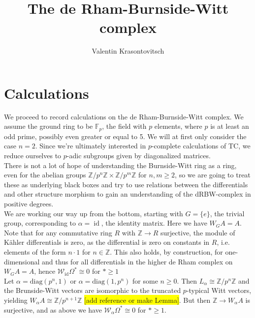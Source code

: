 \documentclass[10pt, a4paper, UKenglish]{article}
\title{The de Rham-Burnside-Witt complex}
\author{Valentin Krasontovitsch}
\numberwithin{equation}{section}
\newcommand{\bF}{\mathbb{F}}
\newcommand{\cW}{\mathcal{W}}
\newcommand{\bZ}{\mathbb{Z}}
\newcommand{\id}{\operatorname{id}}
\newcommand{\diag}{\mathrm{diag}}
\newcommand{\comm}[1]{\colorbox{yellow}{#1}}
\theoremstyle{plain}
\theoremstyle{definition}
\renewcommand{\to}{\longrightarrow}
\begin{document}


{\let\newpage\relax\maketitle}
\maketitle





%

%
\section{Calculations}
We proceed to record calculations on the de Rham-Burnside-Witt complex. We assume the ground ring to be $\bF_p$, the field with $p$ elements, where $p$ is at least an odd prime, possibly even greater or equal to 5. We will at first only consider the case $n=2$. Since we're ultimately interested in $p$-complete calculations of TC, we reduce ourselves to $p$-adic subgroups given by diagonalized matrices.\\
There is not a lot of hope of understanding the Burnside-Witt ring as a ring, even for the abelian groups $\bZ/p^n\bZ \times \bZ/p^m\bZ$ for $n,m \geq 2$, so we are going to treat these as underlying black boxes and try to use relations between the differentials and other structure morphism to gain an understanding of the dRBW-complex in positive degrees.\\
We are working our way up from the bottom, starting with $G=\{e\}$, the trivial group, corresponding to $\alpha = \id$, the identity matrix. Here we have $W_G A = A$. Note that for any commutative ring $R$ with $\bZ \to R$ surjective, the module of K\"ahler differentials is zero, as the differential is zero on constants in $R$, i.e. elements of the form $n \cdot 1$ for $n \in \bZ$. This also holds, by construction, for one-dimensional and thus for all differentials in the higher de Rham complex on $W_G A = A$, hence $\cW_{\id}\Omega^* \cong 0$ for $* \geq 1$\\
Let $\alpha = \diag(p^n, 1)$ or $\alpha = \diag(1,p^n)$ for some $n \geq 0$. Then $L_\alpha \cong \bZ/p^n\bZ$ and the Brunside-Witt vectors are isomorphic to the truncated $p$-typical Witt vectors, yielding $W_\alpha A \cong \bZ/p^{n+1}\bZ$ \comm{[add reference or make Lemma]}. But then $\bZ \to W_\alpha A$ is surjective, and as above we have $\cW_{\alpha}\Omega^* \cong 0$ for $* \geq 1$.\\
\end{document}
